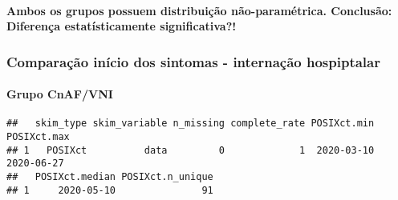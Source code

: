 \documentclass[
]{article}
\newenvironment{Shaded}{\begin{snugshade}}{\end{snugshade}}
\newcommand{\AttributeTok}[1]{\textcolor[rgb]{0.77,0.63,0.00}{#1}}
\newcommand{\FunctionTok}[1]{\textcolor[rgb]{0.00,0.00,0.00}{#1}}
\newcommand{\NormalTok}[1]{#1}
\newcommand{\SpecialCharTok}[1]{\textcolor[rgb]{0.00,0.00,0.00}{#1}}
\newcommand{\StringTok}[1]{\textcolor[rgb]{0.31,0.60,0.02}{#1}}
\begin{document}
\hypertarget{ambos-os-grupos-possuem-distribuiuxe7uxe3o-nuxe3o-paramuxe9trica.-conclusuxe3o-diferenuxe7a-estatuxedsticamente-significativa}{%
\paragraph{\texorpdfstring{\textbf{Ambos os grupos possuem distribuição
não-paramétrica. Conclusão: Diferença estatísticamente
significativa?!}}{Ambos os grupos possuem distribuição não-paramétrica. Conclusão: Diferença estatísticamente significativa?!}}\label{ambos-os-grupos-possuem-distribuiuxe7uxe3o-nuxe3o-paramuxe9trica.-conclusuxe3o-diferenuxe7a-estatuxedsticamente-significativa}}

\hypertarget{comparauxe7uxe3o-inuxedcio-dos-sintomas---internauxe7uxe3o-hospiptalar}{%
\subsubsection{\texorpdfstring{\textbf{Comparação início dos sintomas -
internação
hospiptalar}}{Comparação início dos sintomas - internação hospiptalar}}\label{comparauxe7uxe3o-inuxedcio-dos-sintomas---internauxe7uxe3o-hospiptalar}}

\hypertarget{grupo-cnafvni}{%
\paragraph{\texorpdfstring{\textbf{Grupo
CnAF/VNI}}{Grupo CnAF/VNI}}\label{grupo-cnafvni}}

\begin{Shaded}
\end{Shaded}

\begin{verbatim}
##   skim_type skim_variable n_missing complete_rate POSIXct.min POSIXct.max
## 1   POSIXct          data         0             1  2020-03-10  2020-06-27
##   POSIXct.median POSIXct.n_unique
## 1     2020-05-10               91
\end{verbatim}

\begin{Shaded}
\end{Shaded}
\end{document}
